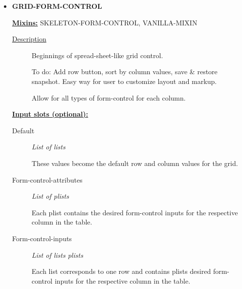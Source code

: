 \documentclass [11pt]{book}
\begin{document}
\begin{itemize}
\begin{description}
\end{description}







\item {}
\textbf{GRID-FORM-CONTROL}


\textbf{
\underline{Mixins:}} SKELETON-FORM-CONTROL, VANILLA-MIXIN





\begin{description}

\item [
\underline{Description}]


Beginnings of spread-sheet-like 
grid control.

To do: Add row button, sort by column values, 
save & restore snapshot. Easy way for user to 
customize layout and markup.

Allow for all types of form-control for each column.





\end{description}








\textbf{
\underline{Input slots (optional):}}

\begin{description}

\item [Default]
\emph{List of lists}

 These values become the default row and column
values for the grid.




\item [Form-control-attributes]
\emph{List of plists}

 Each plist contains the desired form-control
inputs for the respective column in the table.




\item [Form-control-inputs]
\emph{List of lists plists}

 Each list corresponds to one row
and contains plists desired form-control inputs for the
respective column in the table.





\end{description}
\end{itemize}
\end{document}
